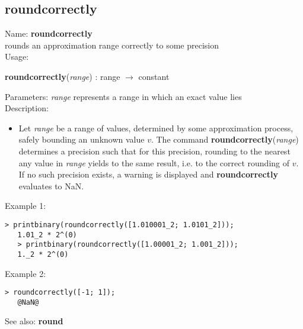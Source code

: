 \subsection{ roundcorrectly }
\noindent Name: \textbf{roundcorrectly}\\
rounds an approximation range correctly to some precision\\

\noindent Usage: 
\begin{center}
\textbf{roundcorrectly}(\emph{range}) : \textsf{range} $\rightarrow$ \textsf{constant}\\
\end{center}
Parameters: 
\emph{range} represents a range in which an exact value lies\\

\noindent Description: \begin{itemize}

\item Let \emph{range} be a range of values, determined by some approximation
   process, safely bounding an unknown value $v$. The command
   \textbf{roundcorrectly}(\emph{range}) determines a precision such that for this precision,
   rounding to the nearest any value in \emph{range} yields to the same
   result, i.e. to the correct rounding of $v$.
   If no such precision exists, a warning is displayed and \textbf{roundcorrectly}
   evaluates to NaN.
\end{itemize}
\noindent Example 1: 
\begin{center}\begin{minipage}{14.8cm}\begin{Verbatim}[frame=single]
   > printbinary(roundcorrectly([1.010001_2; 1.0101_2]));
   1.01_2 * 2^(0)
   > printbinary(roundcorrectly([1.00001_2; 1.001_2]));
   1._2 * 2^(0)
\end{Verbatim}
\end{minipage}\end{center}
\noindent Example 2: 
\begin{center}\begin{minipage}{14.8cm}\begin{Verbatim}[frame=single]
   > roundcorrectly([-1; 1]);
   @NaN@
\end{Verbatim}
\end{minipage}\end{center}
See also: \textbf{round}
